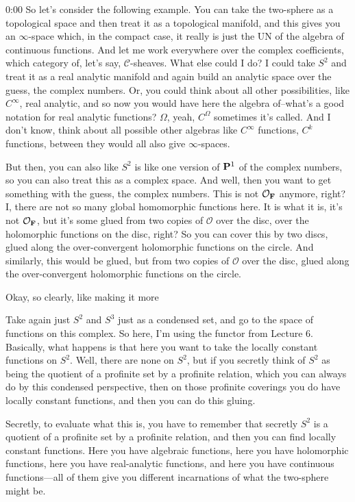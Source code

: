 \begin{unfinished}{0:00}
So let's consider the following example. You can take the two-sphere as a topological space and then treat it as a topological manifold, and this gives you an $\infty$-space which, in the compact case, it really is just the $\mathrm{UN}$ of the algebra of continuous functions. And let me work everywhere over the complex coefficients, which category of, let's say, $\mathcal{C}$-sheaves. What else could I do? I could take $S^2$ and treat it as a real analytic manifold and again build an analytic space over the guess, the complex numbers. Or, you could think about all other possibilities, like $C^\infty$, real analytic, and so now you would have here the algebra of--what's a good notation for real analytic functions? $\Omega$, yeah, $C^\Omega$ sometimes it's called. And I don't know, think about all possible other algebras like $C^\infty$ functions, $C^k$ functions, between they would all also give $\infty$-spaces.

But then, you can also like $S^2$ is like one version of $\P^1$ of the complex numbers, so you can also treat this as a complex space. And well, then you want to get something with the guess, the complex numbers. This is not $\mathcal{O}_\F$ anymore, right? I, there are not so many global homomorphic functions here. It is what it is, it's not $\mathcal{O}_\F$, but it's some glued from two copies of $\mathcal{O}$ over the disc, over the holomorphic functions on the disc, right? So you can cover this by two discs, glued along the over-convergent holomorphic functions on the circle. And similarly, this would be glued, but from two copies of $\mathcal{O}$ over the disc, glued along the over-convergent holomorphic functions on the circle.

Okay, so clearly, like making it more



Take again just $S^2$ and $S^3$ just as a condensed set, and go to the space of functions on this complex. So here, I'm using the functor from Lecture 6. Basically, what happens is that here you want to take the locally constant functions on $S^2$. Well, there are none on $S^2$, but if you secretly think of $S^2$ as being the quotient of a profinite set by a profinite relation, which you can always do by this condensed perspective, then on those profinite coverings you do have locally constant functions, and then you can do this gluing. 

Secretly, to evaluate what this is, you have to remember that secretly $S^2$ is a quotient of a profinite set by a profinite relation, and then you can find locally constant functions. Here you have algebraic functions, here you have holomorphic functions, here you have real-analytic functions, and here you have continuous functions---all of them give you different incarnations of what the two-sphere might be.


\end{unfinished}
